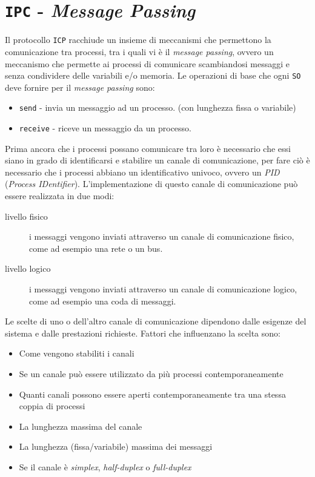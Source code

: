 \section{\texttt{IPC} - \textit{Message Passing}}
    Il protocollo \texttt{ICP} racchiude un insieme di meccanismi che permettono la comunicazione tra processi, tra i quali vi è il \textit{message passing}, ovvero un meccanismo che permette ai processi di comunicare scambiandosi messaggi e senza condividere delle variabili e/o memoria. Le operazioni di base che ogni \texttt{SO} deve fornire per il \textit{message passing} sono:
    \begin{itemize}
        \item \texttt{send} - invia un messaggio ad un processo. (con lunghezza fissa o variabile)
        \item \texttt{receive} - riceve un messaggio da un processo.
    \end{itemize}
    Prima ancora che i processi possano comunicare tra loro è necessario che essi siano in grado di identificarsi e stabilire un canale di comunicazione, per fare ciò è necessario che i processi abbiano un identificativo univoco, ovvero un \textit{PID} (\textit{Process IDentifier}).\newline
    L'implementazione di questo canale di comunicazione può essere realizzata in due modi:
    \begin{description}
        \item[livello fisico] i messaggi vengono inviati attraverso un canale di comunicazione fisico, come ad esempio una rete o un bus.
        \item[livello logico] i messaggi vengono inviati attraverso un canale di comunicazione logico, come ad esempio una coda di messaggi.
    \end{description}
    Le scelte di uno o dell'altro canale di comunicazione dipendono dalle esigenze del sistema e dalle prestazioni richieste. Fattori che influenzano la scelta sono:
    \begin{itemize}
        \item Come vengono stabiliti i canali
        \item Se un canale può essere utilizzato da più processi contemporaneamente
        \item Quanti canali possono essere aperti contemporaneamente tra una stessa coppia di processi
        \item La lunghezza massima del canale
        \item La lunghezza (fissa/variabile) massima dei messaggi
        \item Se il canale è \textit{simplex}, \textit{half-duplex} o \textit{full-duplex}
    \end{itemize}
